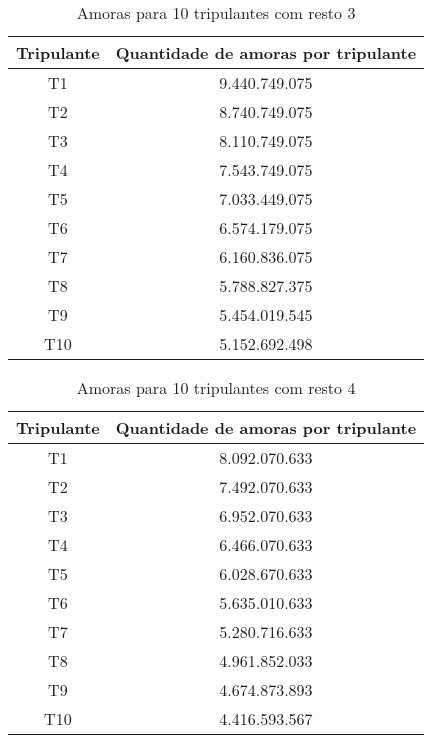 \documentclass[12pt]{article}
\begin{document}
\begin{table}[H]

\centering

\begin{tabular}{|c|c|}

\hline
Tripulante & Quantidade de amoras por tripulante \\
\hline
T1 & 9.440.749.075 \\
\hline
T2 & 8.740.749.075 \\
\hline
T3 & 8.110.749.075 \\
\hline
T4 & 7.543.749.075 \\
\hline
T5 & 7.033.449.075 \\
\hline
T6 & 6.574.179.075 \\
\hline
T7 & 6.160.836.075 \\
\hline
T8 & 5.788.827.375 \\
\hline
T9 & 5.454.019.545 \\
\hline
T10 & 5.152.692.498 \\
\hline

\end{tabular}
\label{Tabela19}
\caption{Amoras para 10 tripulantes com resto 3}

\end{table}

\begin{table}[H]

\centering

\begin{tabular}{|c|c|}

\hline
Tripulante & Quantidade de amoras por tripulante \\
\hline
T1 & 8.092.070.633 \\
\hline
T2 & 7.492.070.633 \\
\hline
T3 & 6.952.070.633 \\
\hline
T4 & 6.466.070.633 \\
\hline
T5 & 6.028.670.633 \\
\hline
T6 & 5.635.010.633 \\
\hline
T7 & 5.280.716.633 \\
\hline
T8 & 4.961.852.033 \\
\hline
T9 & 4.674.873.893 \\
\hline
T10 & 4.416.593.567 \\
\hline

\end{tabular}
\label{Tabela20}
\caption{Amoras para 10 tripulantes com resto 4}

\end{table}
\end{document}
